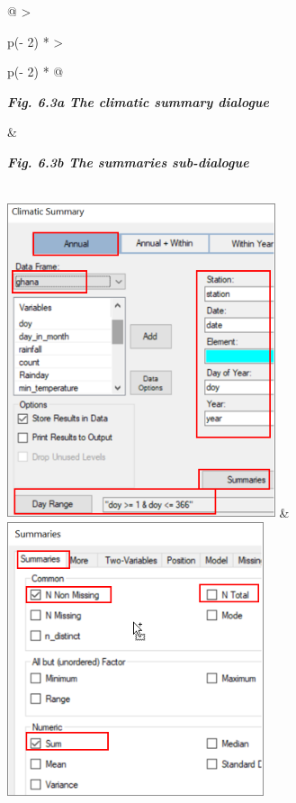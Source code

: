 \documentclass[
  letterpaper,
  DIV=11,
  numbers=noendperiod]{scrreprt}
\begin{document}
\begin{longtable}[]{@{}
  >{\raggedright\arraybackslash}p{(\columnwidth - 2\tabcolsep) * }
  >{\raggedright\arraybackslash}p{(\columnwidth - 2\tabcolsep) * }@{}}
\toprule\noalign{}
\begin{minipage}[b]{\linewidth}\raggedright
\textbf{\emph{Fig. 6.3a The climatic summary dialogue}}
\end{minipage} & \begin{minipage}[b]{\linewidth}\raggedright
\textbf{\emph{Fig. 6.3b The summaries sub-dialogue}}
\end{minipage} \\
\midrule\noalign{}
\endhead
\bottomrule\noalign{}
\endlastfoot
\includegraphics[width=3.10171in,height=3.65872in]{figures/Fig6.3a.png}
&
\includegraphics[width=2.96984in,height=3.1662in]{figures/Fig6.3b.png} \\
\end{longtable}
\end{document}

